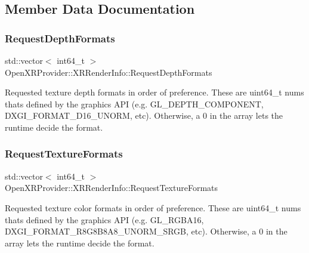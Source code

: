\subsection{Member Data Documentation}
\mbox{\label{struct_open_x_r_provider_1_1_x_r_render_info_aa4ba2f324a4ae14f1e51f2343dd1446b}} 
\subsubsection{\texorpdfstring{RequestDepthFormats}{RequestDepthFormats}}
{\footnotesize\ttfamily std\+::vector$<$ int64\+\_\+t $>$ Open\+X\+R\+Provider\+::\+X\+R\+Render\+Info\+::\+Request\+Depth\+Formats}



Requested texture depth formats in order of preference. These are uint64\+\_\+t nums that\textquotesingle{}s defined by the graphics A\+PI (e.\+g. G\+L\+\_\+\+D\+E\+P\+T\+H\+\_\+\+C\+O\+M\+P\+O\+N\+E\+NT, D\+X\+G\+I\+\_\+\+F\+O\+R\+M\+A\+T\+\_\+\+D16\+\_\+\+U\+N\+O\+RM, etc). Otherwise, a 0 in the array lets the runtime decide the format. 

\mbox{\label{struct_open_x_r_provider_1_1_x_r_render_info_a84860b74dcb11fbc7494883b555f3029}} 
\subsubsection{\texorpdfstring{RequestTextureFormats}{RequestTextureFormats}}
{\footnotesize\ttfamily std\+::vector$<$ int64\+\_\+t $>$ Open\+X\+R\+Provider\+::\+X\+R\+Render\+Info\+::\+Request\+Texture\+Formats}



Requested texture color formats in order of preference. These are uint64\+\_\+t nums that\textquotesingle{}s defined by the graphics A\+PI (e.\+g. G\+L\+\_\+\+R\+G\+B\+A16, D\+X\+G\+I\+\_\+\+F\+O\+R\+M\+A\+T\+\_\+\+R8\+G8\+B8\+A8\+\_\+\+U\+N\+O\+R\+M\+\_\+\+S\+R\+GB, etc). Otherwise, a 0 in the array lets the runtime decide the format. 

